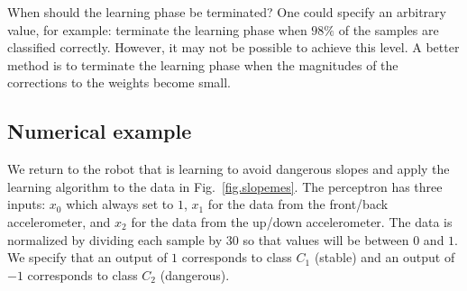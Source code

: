 When should the learning phase be terminated? One could specify an arbitrary value, for example: terminate the learning phase when $98\%$ of the samples are classified correctly. However, it may not be possible to achieve this level. A better method is to terminate the learning phase when the magnitudes of the corrections to the weights become small.

\subsection{Numerical example}

We return to the robot that is learning to avoid dangerous slopes and apply the learning algorithm to the data in Fig.~\ref{fig.slopemes}. The perceptron has three inputs: $x_0$ which always set to $1$, $x_1$ for the data from the front/back accelerometer, and $x_2$ for the data from the up/down accelerometer. The data is normalized by dividing each sample by $30$ so that values will be between $0$ and $1$. We specify that an output of $1$ corresponds to class $C_1$ (stable) and an output of $-1$ corresponds to class $C_2$ (dangerous).

